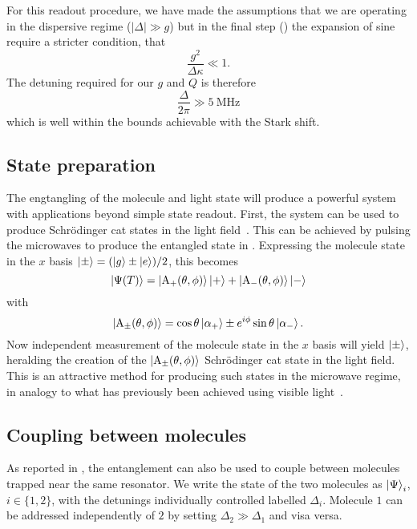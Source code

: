 For this readout procedure, we have made the assumptions that we are operating
in the dispersive regime ($|\Delta| \gg g$) but in the final step
() the expansion of sine require a stricter
condition, that 
%
\begin{equation}
  \frac{g^2}{\Delta\kappa} \ll 1.
\end{equation}
%
The detuning required for our $g$ and $Q$ is therefore
%
\begin{equation}
  \frac{\Delta}{2 \pi} \gg \SI{5}{\mega\hertz}
\end{equation}
%
which is well within the bounds achievable with the Stark shift.

\subsection{State preparation}
\label{mws:cats}

The engtangling of the molecule and light state will produce a powerful system
with applications beyond simple state readout. First, the system can be used to
produce Schr\"odinger cat states in the light field~\cite{Andre2006}. This can be achieved
by pulsing the microwaves to produce the entangled state in
. Expressing the molecule state in the $x$ basis
$\ket{\pm} = (\ket{g} \pm \ket{e})/2$, this becomes
%
\begin{equation}
  \ket{\Psi(T)} = \ket{\mathrm{A}_+(\theta, \phi) }\ket{+} + \ket{\mathrm{A}_-(\theta,
  \phi)}\ket{-}
\end{equation}
%
with
%
\begin{equation}
  \ket{\mathrm{A}_\pm(\theta, \phi)} = \cos\theta\ket{\alpha_+} \pm
  e^{i\phi}\sin\theta\ket{\alpha_-}.
\end{equation}
%
Now independent measurement of the molecule state in the $x$ basis will yield
$\ket{\pm}$, heralding the creation of the $\ket{\mathrm{A}_\pm(\theta, \phi)}$
Schr\"odinger cat state in the light field. This is an attractive method for
producing such states in the microwave regime, in analogy to what has
previously been achieved using visible light~\cite{Hacker2019}.

\subsection{Coupling between molecules}

As reported in , the entanglement can also be used to
couple between molecules trapped near the same resonator. We write the state of
the two molecules as $\ket{\Psi}_i$, $i\in\{1,2\}$, with the detunings
individually controlled labelled $\Delta_i$. Molecule $1$ can be addressed
independently of $2$ by setting $\Delta_2 \gg \Delta_1$ and visa versa. 


